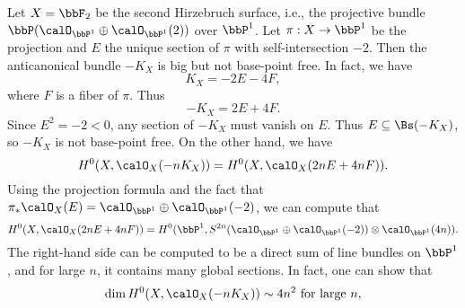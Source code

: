     \begin{example}\label{eg:base_locus_-K_of_Hirzebruch_surface}
        Let \(X=\bbF_2\) be the second Hirzebruch surface, i.e., the projective bundle \(\bbP(\calO_{\bbP^1}\oplus \calO_{\bbP^1}(2))\) over \(\bbP^1\).
        Let \(\pi:X\to \bbP^1\) be the projection and \(E\) the unique section of \(\pi\) with self-intersection \(-2\).
        Then the anticanonical bundle \(-K_X\) is big but not base-point free.
        In fact, we have
        \[
            K_X = -2E - 4F,
        \]
        where \(F\) is a fiber of \(\pi\).
        Thus
        \[
            -K_X = 2E + 4F.
        \]
        Since \(E^2=-2<0\), any section of \(-K_X\) must vanish on \(E\).
        Thus \(E\subseteq \Bs(-K_X)\), so \(-K_X\) is not base-point free.
        On the other hand, we have
        \[
            H^0(X,\calO_X(-nK_X)) = H^0(X,\calO_X(2nE + 4nF)).
        \]
        Using the projection formula and the fact that \(\pi_*\calO_X(E) = \calO_{\bbP^1} \oplus \calO_{\bbP^1}(-2)\), we can compute that
        \[
            H^0(X,\calO_X(2nE + 4nF)) = H^0(\bbP^1, S^{2n}(\calO_{\bbP^1} \oplus \calO_{\bbP^1}(-2)) \otimes \calO_{\bbP^1}(4n)).
        \]
        The right-hand side can be computed to be a direct sum of line bundles on \(\bbP^1\), and for large \(n\), it contains many global sections.
        In fact, one can show that
        \[
            \dim H^0(X,\calO_X(-nK_X)) \sim 4n^2 \text{ for large } n,
        \]
        
    \end{example}



        
